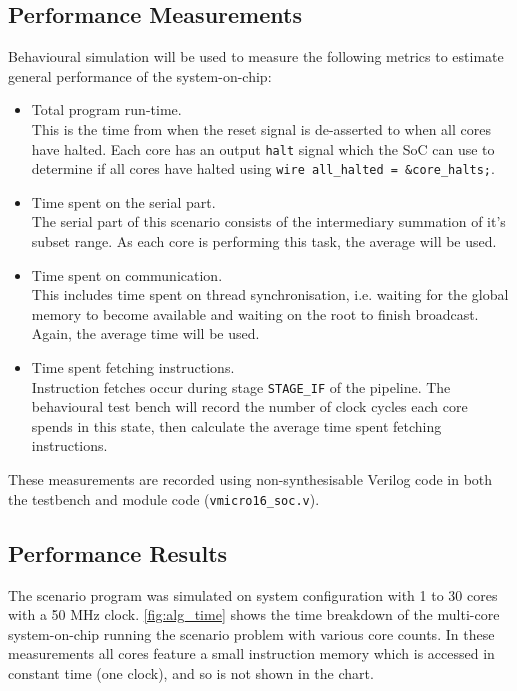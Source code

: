 \subsection{Performance Measurements}
Behavioural simulation will be used to measure the following metrics to estimate general performance of the system-on-chip:
\begin{itemize}
\item Total program run-time.\\This is the time from when the reset signal is de-asserted to when all cores have halted. Each core has an output \verb|halt| signal which the SoC can use to determine if all cores have halted using \verb|wire all_halted = &core_halts;|. 

\item Time spent on the serial part.\\The serial part of this scenario consists of the intermediary summation of it's subset range. As each core is performing this task, the average will be used.

\item Time spent on communication.\\This includes time spent on thread synchronisation, i.e. waiting for the global memory to become available and waiting on the root to finish broadcast. Again, the average time will be used.

\item Time spent fetching instructions.\\Instruction fetches occur during stage \verb|STAGE_IF| of the pipeline. The behavioural test bench will record the number of clock cycles each core spends in this state, then calculate the average time spent fetching instructions. 
\end{itemize}

These measurements are recorded using non-synthesisable Verilog code in both the testbench and module code (\verb|vmicro16_soc.v|).

\subsection{Performance Results}
The scenario program was simulated on system configuration with 1 to 30 cores with a 50 MHz clock.
\cref{fig:alg_time} shows the time breakdown of the multi-core system-on-chip running the scenario problem with various core counts. In these measurements all cores feature a small instruction memory which is accessed in constant time (one clock), and so is not shown in the chart. 


